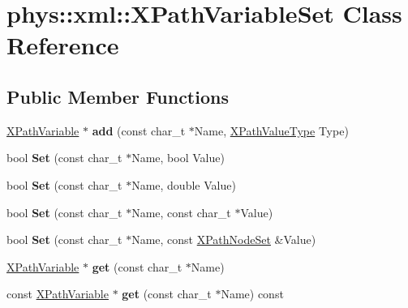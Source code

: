 \hypertarget{classphys_1_1xml_1_1XPathVariableSet}{
\section{phys::xml::XPathVariableSet Class Reference}
\label{df/dd1/classphys_1_1xml_1_1XPathVariableSet}
}
\subsection*{Public Member Functions}
\begin{DoxyCompactItemize}
\item 
\hypertarget{classphys_1_1xml_1_1XPathVariableSet_af498fe5e6ccaedd35be0c9efc9af645e}{
\hyperlink{classphys_1_1xml_1_1XPathVariable}{XPathVariable} $\ast$ {\bfseries add} (const char\_\-t $\ast$Name, \hyperlink{namespacephys_1_1xml_a339b9eef674ba44100110e5524bc575d}{XPathValueType} Type)}
\label{df/dd1/classphys_1_1xml_1_1XPathVariableSet_af498fe5e6ccaedd35be0c9efc9af645e}

\item 
\hypertarget{classphys_1_1xml_1_1XPathVariableSet_af21e7f97081284d98b18562b59299543}{
bool {\bfseries Set} (const char\_\-t $\ast$Name, bool Value)}
\label{df/dd1/classphys_1_1xml_1_1XPathVariableSet_af21e7f97081284d98b18562b59299543}

\item 
\hypertarget{classphys_1_1xml_1_1XPathVariableSet_aa713e33048ee463a58b9e6988daab214}{
bool {\bfseries Set} (const char\_\-t $\ast$Name, double Value)}
\label{df/dd1/classphys_1_1xml_1_1XPathVariableSet_aa713e33048ee463a58b9e6988daab214}

\item 
\hypertarget{classphys_1_1xml_1_1XPathVariableSet_afa99a98b5c4e4790a921f67a153a9ff4}{
bool {\bfseries Set} (const char\_\-t $\ast$Name, const char\_\-t $\ast$Value)}
\label{df/dd1/classphys_1_1xml_1_1XPathVariableSet_afa99a98b5c4e4790a921f67a153a9ff4}

\item 
\hypertarget{classphys_1_1xml_1_1XPathVariableSet_a61fe3aa60d13a4a224d301456a230a7c}{
bool {\bfseries Set} (const char\_\-t $\ast$Name, const \hyperlink{classphys_1_1xml_1_1XPathNodeSet}{XPathNodeSet} \&Value)}
\label{df/dd1/classphys_1_1xml_1_1XPathVariableSet_a61fe3aa60d13a4a224d301456a230a7c}

\item 
\hypertarget{classphys_1_1xml_1_1XPathVariableSet_ab84e282b7148b93254b60dc8af3392a9}{
\hyperlink{classphys_1_1xml_1_1XPathVariable}{XPathVariable} $\ast$ {\bfseries get} (const char\_\-t $\ast$Name)}
\label{df/dd1/classphys_1_1xml_1_1XPathVariableSet_ab84e282b7148b93254b60dc8af3392a9}

\item 
\hypertarget{classphys_1_1xml_1_1XPathVariableSet_a08ba31f8616da275915810d876c98324}{
const \hyperlink{classphys_1_1xml_1_1XPathVariable}{XPathVariable} $\ast$ {\bfseries get} (const char\_\-t $\ast$Name) const }
\label{df/dd1/classphys_1_1xml_1_1XPathVariableSet_a08ba31f8616da275915810d876c98324}

\end{DoxyCompactItemize}


